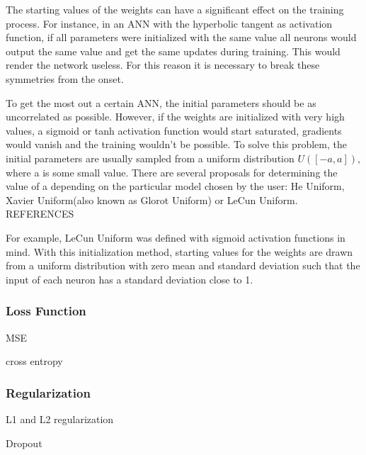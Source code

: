 \documentclass{article}
\begin{document}
The starting values of the weights can have a significant effect on the training process. For instance, in an ANN with the hyperbolic tangent as activation function, if all parameters were initialized with the same value all neurons would output the same value and get the same updates during training. This would render the network useless. For this reason it is necessary to break these symmetries from the onset.

To get the most out a certain ANN, the initial parameters should be as  uncorrelated as possible. However, if the weights are initialized with very high values, a sigmoid or tanh activation function would start saturated, gradients would vanish and the training wouldn't be possible.
To solve this problem, the initial parameters are usually  sampled from a uniform distribution $U([-a,a])$, where a is some small value. There are several proposals for determining the value of a depending on the particular model chosen by the user: He Uniform, Xavier Uniform(also known as Glorot Uniform) or LeCun Uniform. REFERENCES

For example, LeCun Uniform was defined with sigmoid activation functions in mind. With this initialization method, starting values for the weights are drawn from a uniform distribution with zero mean and standard deviation such that the input of each neuron has a standard deviation close to 1.

\subsubsection{Loss Function}
\label{subsubsec:loss-function}
MSE

cross entropy

\subsubsection{Regularization}

L1 and L2 regularization

Dropout
\end{document}
